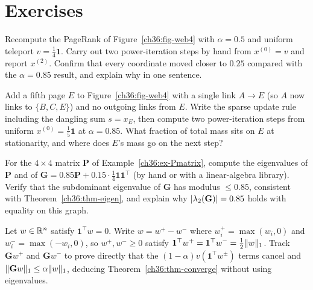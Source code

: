 \section{Exercises}
\label{ch36:exercises}

\begin{exercise}
Recompute the PageRank of Figure~\ref{ch36:fig-web4} with $\alpha = 0.5$ and uniform teleport $v = \tfrac14\mathbf{1}$. Carry out two power-iteration steps by hand from $x^{(0)} = v$ and report $x^{(2)}$. Confirm that every coordinate moved closer to $0.25$ compared with the $\alpha = 0.85$ result, and explain why in one sentence.
\end{exercise}

\begin{exercise}
Add a fifth page $E$ to Figure~\ref{ch36:fig-web4} with a single link $A \to E$ (so $A$ now links to $\{B,C,E\}$) and no outgoing links from $E$. Write the sparse update rule including the dangling sum $s = x_E$, then compute two power-iteration steps from uniform $x^{(0)} = \tfrac15\mathbf{1}$ at $\alpha = 0.85$. What fraction of total mass sits on $E$ at stationarity, and where does $E$'s mass go on the next step?
\end{exercise}

\begin{exercise}
For the $4\times4$ matrix $\mathbf{P}$ of Example~\ref{ch36:ex-Pmatrix}, compute the eigenvalues of $\mathbf{P}$ and of $\mathbf{G} = 0.85\mathbf{P} + 0.15\cdot\tfrac14\mathbf{1}\mathbf{1}^\top$ (by hand or with a linear-algebra library). Verify that the subdominant eigenvalue of $\mathbf{G}$ has modulus $\le 0.85$, consistent with Theorem~\ref{ch36:thm-eigen}, and explain why $\lvert\lambda_2(\mathbf{G})\rvert = 0.85$ holds with equality on this graph.
\end{exercise}

\begin{exercise}
Let $w \in \mathbb{R}^n$ satisfy $\mathbf{1}^\top w = 0$. Write $w = w^+ - w^-$ where $w^+_i = \max(w_i, 0)$ and $w^-_i = \max(-w_i, 0)$, so $w^+, w^- \ge 0$ satisfy $\mathbf{1}^\top w^+ = \mathbf{1}^\top w^- = \tfrac12\lVert w\rVert_1$. Track $\mathbf{G}w^+$ and $\mathbf{G}w^-$ to prove directly that the $(1-\alpha)v(\mathbf{1}^\top w^\pm)$ terms cancel and $\lVert\mathbf{G}w\rVert_1 \le \alpha\lVert w\rVert_1$, deducing Theorem~\ref{ch36:thm-converge} without using eigenvalues.
\end{exercise}

